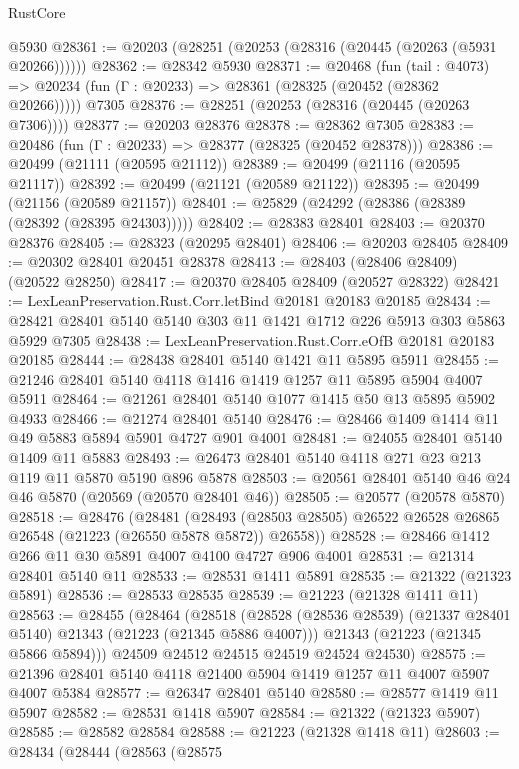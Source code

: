 \begin{lexlean}{RustCore}
\begin{coremodule}
    @5930
@28361 := @20203 (@28251 (@20253 (@28316 (@20445 (@20263 (@5931 @20266))))))
@28362 := @28342 @5930
@28371 := @20468
    (fun (tail : @4073) => @20234 (fun (Γ : @20233) => @28361 (@28325 (@20452 (@28362 @20266)))))
    @7305
@28376 := @28251 (@20253 (@28316 (@20445 (@20263 @7306))))
@28377 := @20203 @28376
@28378 := @28362 @7305
@28383 := @20486 (fun (Γ : @20233) => @28377 (@28325 (@20452 @28378)))
@28386 := @20499 (@21111 (@20595 @21112))
@28389 := @20499 (@21116 (@20595 @21117))
@28392 := @20499 (@21121 (@20589 @21122))
@28395 := @20499 (@21156 (@20589 @21157))
@28401 := @25829 (@24292 (@28386 (@28389 (@28392 (@28395 @24303)))))
@28402 := @28383 @28401
@28403 := @20370 @28376
@28405 := @28323 (@20295 @28401)
@28406 := @20203 @28405
@28409 := @20302 @28401 @20451 @28378
@28413 := @28403 (@28406 @28409) (@20522 @28250)
@28417 := @20370 @28405 @28409 (@20527 @28322)
@28421 := LexLeanPreservation.Rust.Corr.letBind @20181 @20183 @20185
@28434 := @28421 @28401 @5140 @5140 @303 @11 @1421 @1712 @226 @5913 @303 @5863 @5929 @7305
@28438 := LexLeanPreservation.Rust.Corr.eOfB @20181 @20183 @20185
@28444 := @28438 @28401 @5140 @1421 @11 @5895 @5911
@28455 := @21246 @28401 @5140 @4118 @1416 @1419 @1257 @11 @5895 @5904 @4007 @5911
@28464 := @21261 @28401 @5140 @1077 @1415 @50 @13 @5895 @5902 @4933
@28466 := @21274 @28401 @5140
@28476 := @28466 @1409 @1414 @11 @49 @5883 @5894 @5901 @4727 @901 @4001
@28481 := @24055 @28401 @5140 @1409 @11 @5883
@28493 := @26473 @28401 @5140 @4118 @271 @23 @213 @119 @11 @5870 @5190 @896 @5878
@28503 := @20561 @28401 @5140 @46 @24 @46 @5870 (@20569 (@20570 @28401 @46))
@28505 := @20577 (@20578 @5870)
@28518 := @28476
    (@28481
      (@28493 (@28503 @28505) @26522 @26528 @26865 @26548 (@21223 (@26550 @5878 @5872)) @26558))
@28528 := @28466 @1412 @266 @11 @30 @5891 @4007 @4100 @4727 @906 @4001
@28531 := @21314 @28401 @5140 @11
@28533 := @28531 @1411 @5891
@28535 := @21322 (@21323 @5891)
@28536 := @28533 @28535
@28539 := @21223 (@21328 @1411 @11)
@28563 := @28455
    (@28464
      (@28518
        (@28528 (@28536 @28539) (@21337 @28401 @5140) @21343 (@21223 (@21345 @5886 @4007)))
        @21343
        (@21223 (@21345 @5866 @5894)))
      @24509
      @24512
      @24515
      @24519
      @24524
      @24530)
@28575 := @21396 @28401 @5140 @4118 @21400 @5904 @1419 @1257 @11 @4007 @5907 @4007 @5384
@28577 := @26347 @28401 @5140
@28580 := @28577 @1419 @11 @5907
@28582 := @28531 @1418 @5907
@28584 := @21322 (@21323 @5907)
@28585 := @28582 @28584
@28588 := @21223 (@21328 @1418 @11)
@28603 := @28434
    (@28444
      (@28563
        (@28575

\end{coremodule}
\end{lexlean}
